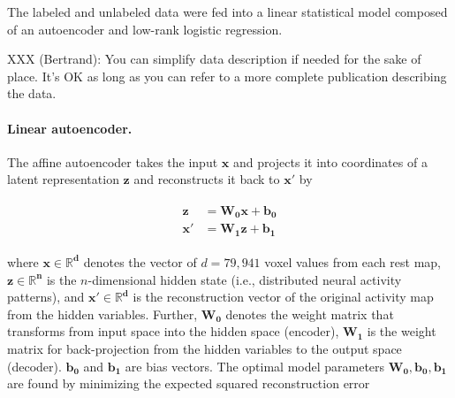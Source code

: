 \documentclass{article} %
\begin{document}
The labeled and unlabeled data were fed into a linear statistical model
composed of an autoencoder and low-rank logistic regression.


XXX (Bertrand): You can simplify data description if needed for the sake of place. It's OK as long as you can refer to a more complete publication describing the data.

\paragraph{Linear autoencoder.}
The affine autoencoder takes the input 
$\mathbf{x}$ and projects it into coordinates of a
latent representation $\mathbf{z}$
and reconstructs it back to $\mathbf{x'}$ by

\begin{eqnarray}
  \begin{split}
    \mathbf{z} &= \mathbf{W_0} \mathbf{x} + \mathbf{b_0} \\
    \mathbf{x'} &= \mathbf{W_1} \mathbf{z} + \mathbf{b_1}
  \end{split}
  \label{eq:autoenc}
\end{eqnarray}

where $\mathbf{x \in \mathbb{R}^{d}}$ denotes the vector of $d=79{,}941$
voxel values from each
rest map,
$\mathbf{z \in \mathbb{R}^{n}}$ is the $n$-dimensional hidden state
(i.e., distributed neural activity patterns), and 
$\mathbf{x' \in \mathbb{R}^{d}}$
is the reconstruction vector of the original activity map
from the hidden variables. 
Further, $\mathbf{W_0}$ denotes the weight matrix that
transforms
from input space into the hidden space (encoder),
$\mathbf{W_1}$ is the weight matrix for back-projection
from the hidden variables to the
output space (decoder).
$\mathbf{b_0}$ and $\mathbf{b_1}$ are bias vectors.
The optimal model parameters $\mathbf{W_0, b_0, b_1}$ are found by
minimizing the expected squared reconstruction error
\end{document}
